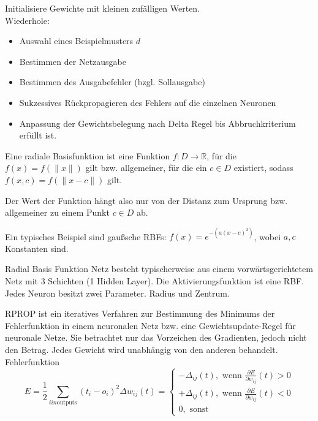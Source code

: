 Initialisiere Gewichte mit kleinen zufälligen Werten.\\

Wiederhole:
\begin{itemize}
    \item Auswahl eines Beispielmusters $d$
    \item Bestimmen der Netzausgabe
    \item Bestimmen des Ausgabefehler (bzgl. Sollausgabe)
    \item Sukzessives Rückpropagieren des Fehlers auf die einzelnen Neuronen
    \item Anpassung der Gewichtsbelegung nach Delta Regel bis Abbruchkriterium
    erfüllt ist.
\end{itemize}

Eine radiale Basisfunktion ist eine Funktion $f: D \rightarrow \mathbb{R}$,
für die $f(x) = f(\|x\|)$ gilt bzw. allgemeiner, für die ein $c \in D$
existiert, sodass $f(x, c) = f(\|x - c\|)$ gilt. 

Der Wert der Funktion hängt also nur von der Distanz zum Ursprung bzw.
allgemeiner zu einem Punkt $c \in D$ ab.

Ein typisches Beispiel sind gaußsche RBFs:
$f(x) = e^{-(a (x - c)^2)}$, wobei $a, c$ Konstanten sind.

Radial Basis Funktion Netz besteht typischerweise aus einem vorwärtsgerichtetem Netz
mit 3 Schichten (1 Hidden Layer). Die Aktivierungsfunktion ist eine RBF. Jedes Neuron
besitzt zwei Parameter. Radius und Zentrum.

RPROP ist ein iteratives Verfahren zur Bestimmung des Minimums der
Fehlerfunktion in einem neuronalen Netz bzw. eine Gewichtsupdate-Regel
für neuronale Netze. Sie betrachtet nur das Vorzeichen des Gradienten,
jedoch nicht den Betrag. Jedes Gewicht wird unabhängig von den anderen behandelt.\\

Fehlerfunktion
\begin{displaymath}
    E = \frac{1}{2} \sum_{i in \text{outputs}}(t_i -o_i)^2
\Delta w_{ij}(t)= \begin{cases}
-\Delta_{ij}(t), \text{ wenn } \frac{\partial E}{\partial w_{ij}}(t) > 0 \\
+\Delta_{ij}(t), \text{ wenn }\frac{\partial E}{\partial w_{ij}}(t) < 0 \\
0, \text{ sonst}
\end{cases}
\end{displaymath}


